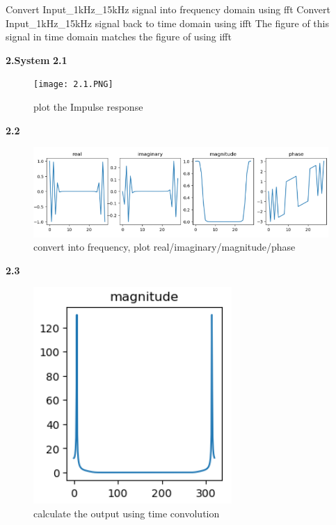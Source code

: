 \documentclass{article}
\begin{document}
Convert Input\_1kHz\_15kHz signal into frequency domain using fft\newline
Convert Input\_1kHz\_15kHz signal back to time domain using ifft\newline
The figure of this signal in time domain matches the figure of using ifft\newline

\newpage
\textbf{2.System}\newline
\textbf{2.1}
\begin{figure}[H]
         \centering
         \texttt{[image: 2.1.PNG]}
         \caption{plot the Impulse response}
 \end{figure}
\textbf{2.2}
\begin{figure}[H]
         \centering
          \includegraphics[width=.7\linewidth]{2.2.PNG}
         \caption{convert into frequency, plot real/imaginary/magnitude/phase}
 \end{figure}
\textbf{2.3}
\begin{figure}[H]
         \centering
        \includegraphics[width=.7\linewidth]{2.3.PNG}
         \caption{calculate the output using time convolution}
\end{figure}
\end{document}
